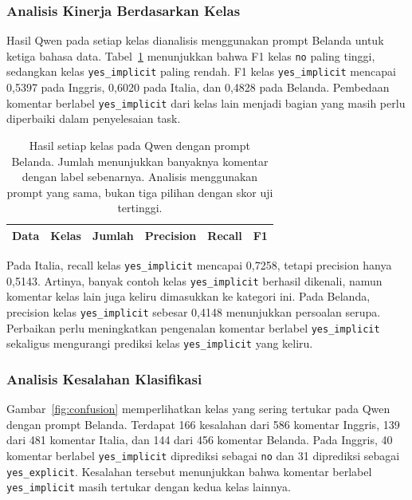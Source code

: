 \documentclass[11pt]{article}
\begin{document}
\subsubsection{Analisis Kinerja Berdasarkan Kelas}
Hasil Qwen pada setiap kelas dianalisis menggunakan prompt Belanda untuk ketiga bahasa data. Tabel~\ref{tab:classes} menunjukkan bahwa F1 kelas \texttt{no} paling tinggi, sedangkan kelas \texttt{yes\_implicit} paling rendah. F1 kelas \texttt{yes\_implicit} mencapai 0,5397 pada Inggris, 0,6020 pada Italia, dan 0,4828 pada Belanda. Pembedaan komentar berlabel \texttt{yes\_implicit} dari kelas lain menjadi bagian yang masih perlu diperbaiki dalam penyelesaian task.

\begin{table}[t]
\centering
\begin{tabular}{llrrrr}
\toprule
Data & Kelas & Jumlah & Precision & Recall & F1 \\
\midrule

\end{tabular}
\caption{Hasil setiap kelas pada Qwen dengan prompt Belanda. Jumlah menunjukkan banyaknya komentar dengan label sebenarnya. Analisis menggunakan prompt yang sama, bukan tiga pilihan dengan skor uji tertinggi.}
\label{tab:classes}
\end{table}

Pada Italia, recall kelas \texttt{yes\_implicit} mencapai 0,7258, tetapi precision hanya 0,5143. Artinya, banyak contoh kelas \texttt{yes\_implicit} berhasil dikenali, namun komentar kelas lain juga keliru dimasukkan ke kategori ini. Pada Belanda, precision kelas \texttt{yes\_implicit} sebesar 0,4148 menunjukkan persoalan serupa. Perbaikan perlu meningkatkan pengenalan komentar berlabel \texttt{yes\_implicit} sekaligus mengurangi prediksi kelas \texttt{yes\_implicit} yang keliru.

\subsubsection{Analisis Kesalahan Klasifikasi}
Gambar~\ref{fig:confusion} memperlihatkan kelas yang sering tertukar pada Qwen dengan prompt Belanda. Terdapat 166 kesalahan dari 586 komentar Inggris, 139 dari 481 komentar Italia, dan 144 dari 456 komentar Belanda. Pada Inggris, 40 komentar berlabel \texttt{yes\_implicit} diprediksi sebagai \texttt{no} dan 31 diprediksi sebagai \texttt{yes\_explicit}. Kesalahan tersebut menunjukkan bahwa komentar berlabel \texttt{yes\_implicit} masih tertukar dengan kedua kelas lainnya.
\end{document}
